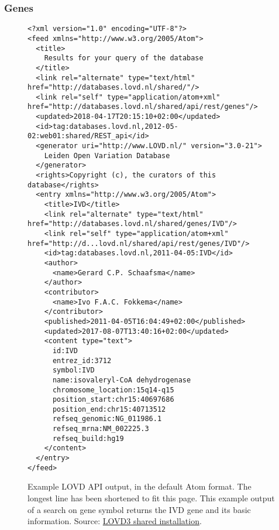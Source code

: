 \subsubsection{Genes}
\begin{figure}[ht]
  \begin{shaded}
    \scriptsize
    \begin{verbatim}
<?xml version="1.0" encoding="UTF-8"?>
<feed xmlns="http://www.w3.org/2005/Atom">
  <title>
    Results for your query of the database
  </title>
  <link rel="alternate" type="text/html" href="http://databases.lovd.nl/shared/"/>
  <link rel="self" type="application/atom+xml" href="http://databases.lovd.nl/shared/api/rest/genes"/>
  <updated>2018-04-17T20:15:10+02:00</updated>
  <id>tag:databases.lovd.nl,2012-05-02:web01:shared/REST_api</id>
  <generator uri="http://www.LOVD.nl/" version="3.0-21">
    Leiden Open Variation Database
  </generator>
  <rights>Copyright (c), the curators of this database</rights>
  <entry xmlns="http://www.w3.org/2005/Atom">
    <title>IVD</title>
    <link rel="alternate" type="text/html" href="http://databases.lovd.nl/shared/genes/IVD"/>
    <link rel="self" type="application/atom+xml" href="http://d...lovd.nl/shared/api/rest/genes/IVD"/>
    <id>tag:databases.lovd.nl,2011-04-05:IVD</id>
    <author>
      <name>Gerard C.P. Schaafsma</name>
    </author>
    <contributor>
      <name>Ivo F.A.C. Fokkema</name>
    </contributor>
    <published>2011-04-05T16:04:49+02:00</published>
    <updated>2017-08-07T13:40:16+02:00</updated>
    <content type="text">
      id:IVD
      entrez_id:3712
      symbol:IVD
      name:isovaleryl-CoA dehydrogenase
      chromosome_location:15q14-q15
      position_start:chr15:40697686
      position_end:chr15:40713512
      refseq_genomic:NG_011986.1
      refseq_mrna:NM_002225.3
      refseq_build:hg19
    </content>
  </entry>
</feed>
    \end{verbatim}
  \caption{%
    Example LOVD API output, in the default Atom format.
    The longest line has been shortened to fit this page.
    This example output of a search on gene symbol returns the IVD gene and its basic information.
    Source: \href{http://databases.lovd.nl/shared/api/rest/genes?search_symbol=IVD}
     {LOVD3 shared installation}.}
  \end{shaded}
\end{figure}

